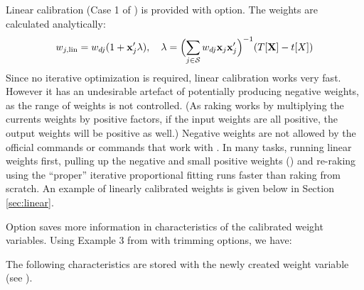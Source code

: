 Linear calibration (Case 1 of \citet{deville:sarndal:1992}) is provided with
 option. The weights are calculated analytically:
\begin{equation}
    \label{eq:linear:weight}
    w_{j,\rm{lin}} = w_{dj} (1+\mathbf{x}_j'\mathbf{\lambda}),
    \quad
    \mathbf{\lambda} = \Bigl( \sum_{j \in \mathcal{S}} w_{dj} \mathbf{x}_j \mathbf{x}_j' \Bigr)^{-1}
        ( T [ \mathbf{X}  ] - t[X] )
\end{equation}
Since no iterative optimization is required, linear calibration works very fast.
However it has an undesirable artefact of potentially producing negative weights,
as the range of weights is not controlled. (As raking works by multiplying the currents
weights by positive factors, if the input weights are all positive, the output weights
will be positive as well.) Negative weights are not allowed by the official  commands
or commands that work with \stcmd{[pweights]}.
In many tasks, running linear weights first,
pulling up the negative and small positive weights ()
and re-raking using the ``proper'' iterative proportional fitting runs faster than
raking from scratch. An example of linearly calibrated weights is given below
in Section \ref{sec:linear}.

Option  saves more information in characteristics of the calibrated
weight variables. Using Example 3 from \citet{kolenikov:2014} with trimming options,
we have:


\begin{stlog}
\nullskip
\end{stlog}

The following characteristics are stored with the newly created weight variable
(see ).

